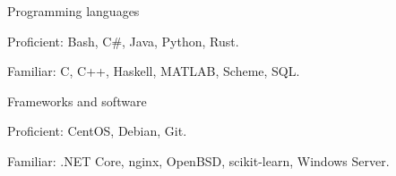 
\begin{cventries}
  \cventry
    {}
    {Programming languages} %
    {}
    {}
    {
      \begin{cvitems} %
         \item {Proficient: Bash, C\#, Java, Python, Rust.}
         \vspace{0.5mm}
         \item {Familiar: C, C++, Haskell, MATLAB, Scheme, SQL.}
      \end{cvitems}
    }
    
  \cventry
    {}
    {Frameworks and software}
    {}
    {}
    {
      \begin{cvitems}
         \item {Proficient: CentOS, Debian, Git.}
         \vspace{0.5mm}
         \item {Familiar: .NET Core, nginx, OpenBSD, scikit-learn, Windows Server.}
      \end{cvitems}
    }
\end{cventries}
